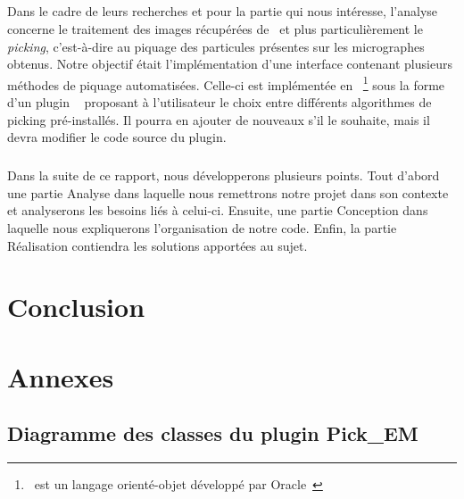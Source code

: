 \documentclass[12pt,a4paper]{report}
\begin{document}
\paragraph*{}
Dans le cadre de leurs recherches et pour la partie qui nous intéresse, l'analyse concerne le traitement des images récupérées de \cme\ et plus particulièrement le \emph{picking}, c'est-à-dire au piquage des particules présentes sur les micrographes obtenus. %
Notre objectif était l'implémentation d'une interface contenant plusieurs méthodes de piquage automatisées.
Celle-ci est implémentée en \java ~\footnote{\java\ est un langage orienté-objet développé par Oracle~\cite{java:url}} sous la forme d'un plugin \imj ~\cite{imagej:url} proposant à l'utilisateur le choix entre différents algorithmes de picking pré-installés. Il pourra en ajouter de nouveaux s'il le souhaite, mais il devra modifier le code source du plugin. 

\paragraph*{}
Dans la suite de ce rapport, nous développerons plusieurs points. Tout d'abord une partie Analyse dans laquelle nous remettrons notre projet dans son contexte et analyserons les besoins liés à celui-ci. Ensuite, une partie Conception dans laquelle nous expliquerons l'organisation de notre code. Enfin, la partie Réalisation contiendra les solutions apportées au sujet.







\chapter*{Conclusion}





\appendix
\chapter{Annexes}


\newpage

\section{Diagramme des classes du plugin Pick\_EM}
\end{document}
